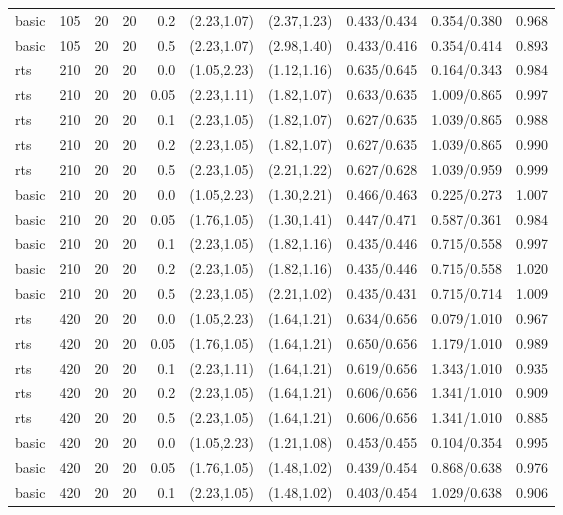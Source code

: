 \begin{tabular}{llrrrccccc}
basic & 105 & 20 & 20 & 0.2 & (2.23,1.07) & (2.37,1.23) & 0.433/0.434 & 0.354/0.380 & 0.968 \\
basic & 105 & 20 & 20 & 0.5 & (2.23,1.07) & (2.98,1.40) & 0.433/0.416 & 0.354/0.414 & 0.893 \\
rts & 210 & 20 & 20 & 0.0 & (1.05,2.23) & (1.12,1.16) & 0.635/0.645 & 0.164/0.343 & 0.984 \\
rts & 210 & 20 & 20 & 0.05 & (2.23,1.11) & (1.82,1.07) & 0.633/0.635 & 1.009/0.865 & 0.997 \\
rts & 210 & 20 & 20 & 0.1 & (2.23,1.05) & (1.82,1.07) & 0.627/0.635 & 1.039/0.865 & 0.988 \\
rts & 210 & 20 & 20 & 0.2 & (2.23,1.05) & (1.82,1.07) & 0.627/0.635 & 1.039/0.865 & 0.990 \\
rts & 210 & 20 & 20 & 0.5 & (2.23,1.05) & (2.21,1.22) & 0.627/0.628 & 1.039/0.959 & 0.999 \\
basic & 210 & 20 & 20 & 0.0 & (1.05,2.23) & (1.30,2.21) & 0.466/0.463 & 0.225/0.273 & 1.007 \\
basic & 210 & 20 & 20 & 0.05 & (1.76,1.05) & (1.30,1.41) & 0.447/0.471 & 0.587/0.361 & 0.984 \\
basic & 210 & 20 & 20 & 0.1 & (2.23,1.05) & (1.82,1.16) & 0.435/0.446 & 0.715/0.558 & 0.997 \\
basic & 210 & 20 & 20 & 0.2 & (2.23,1.05) & (1.82,1.16) & 0.435/0.446 & 0.715/0.558 & 1.020 \\
basic & 210 & 20 & 20 & 0.5 & (2.23,1.05) & (2.21,1.02) & 0.435/0.431 & 0.715/0.714 & 1.009 \\
rts & 420 & 20 & 20 & 0.0 & (1.05,2.23) & (1.64,1.21) & 0.634/0.656 & 0.079/1.010 & 0.967 \\
rts & 420 & 20 & 20 & 0.05 & (1.76,1.05) & (1.64,1.21) & 0.650/0.656 & 1.179/1.010 & 0.989 \\
rts & 420 & 20 & 20 & 0.1 & (2.23,1.11) & (1.64,1.21) & 0.619/0.656 & 1.343/1.010 & 0.935 \\
rts & 420 & 20 & 20 & 0.2 & (2.23,1.05) & (1.64,1.21) & 0.606/0.656 & 1.341/1.010 & 0.909 \\
rts & 420 & 20 & 20 & 0.5 & (2.23,1.05) & (1.64,1.21) & 0.606/0.656 & 1.341/1.010 & 0.885 \\
basic & 420 & 20 & 20 & 0.0 & (1.05,2.23) & (1.21,1.08) & 0.453/0.455 & 0.104/0.354 & 0.995 \\
basic & 420 & 20 & 20 & 0.05 & (1.76,1.05) & (1.48,1.02) & 0.439/0.454 & 0.868/0.638 & 0.976 \\
basic & 420 & 20 & 20 & 0.1 & (2.23,1.05) & (1.48,1.02) & 0.403/0.454 & 1.029/0.638 & 0.906 \\

\end{tabular}
